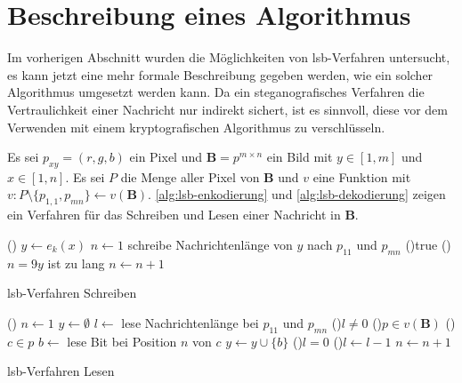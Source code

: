 \section{Beschreibung eines Algorithmus}
Im vorherigen Abschnitt wurden die Möglichkeiten von \acs{lsb}-Verfahren untersucht,
es kann jetzt eine mehr formale Beschreibung gegeben werden,
wie ein solcher Algorithmus umgesetzt werden kann.
Da ein steganografisches Verfahren die Vertraulichkeit einer Nachricht
nur indirekt sichert, ist es sinnvoll, diese vor dem Verwenden mit einem
kryptografischen Algorithmus zu verschlüsseln.

\begin{definition}
  Es sei $p_{xy} = (r,g,b)$ ein Pixel und $\mathbf{B} = p^{m \times n}$ ein Bild
  mit $y \in [1, m]$ und $x \in [1, n]$. Es sei $P$ die Menge aller Pixel von $\mathbf{B}$
  und $v$ eine Funktion mit $v: P \setminus \{p_{1,1},p_{mn}\} \leftarrow v(\mathbf{B})$.
  \autoref{alg:lsb-enkodierung} und \ref{alg:lsb-dekodierung} zeigen ein Verfahren für das
  Schreiben und Lesen einer Nachricht in $\mathbf{B}$.
  \begin{algorithm}
    \DontPrintSemicolon
    \Begin(){
      $y \leftarrow e_k(x)$\;
      $n \leftarrow 1$\;
      schreibe Nachrichtenlänge von $y$ nach $p_{11}$ und $p_{mn}$\;
      \While(){true}{
        \lIf(){$n = 9$}{$y$ ist zu lang}
        $n \leftarrow n + 1$\;
      }
    }
    \caption{\acs{lsb}-Verfahren Schreiben}
    \label{alg:lsb-enkodierung}
  \end{algorithm}

  \begin{algorithm}[H]
    \DontPrintSemicolon
    \Begin(){
      $n \leftarrow 1$\;
      $y \leftarrow \emptyset$\;
      $l \leftarrow$ lese Nachrichtenlänge bei $p_{11}$ und $p_{mn}$\;
      \While(){$l \neq 0$}{
        \For(){$p \in v(\mathbf{B})$}{
          \For(){$c \in p$}{
            $b \leftarrow$ lese Bit bei Position $n$ von $c$\;
            $y \leftarrow y \cup \{b\}$\;
            \lIf(){$l = 0$} {
            }
            \lElse(){$l \leftarrow l - 1$}
          }
        }
        $n \leftarrow n + 1$\;
      }
    }
    \caption{\acs{lsb}-Verfahren Lesen}
    \label{alg:lsb-dekodierung}
  \end{algorithm}
\end{definition}

